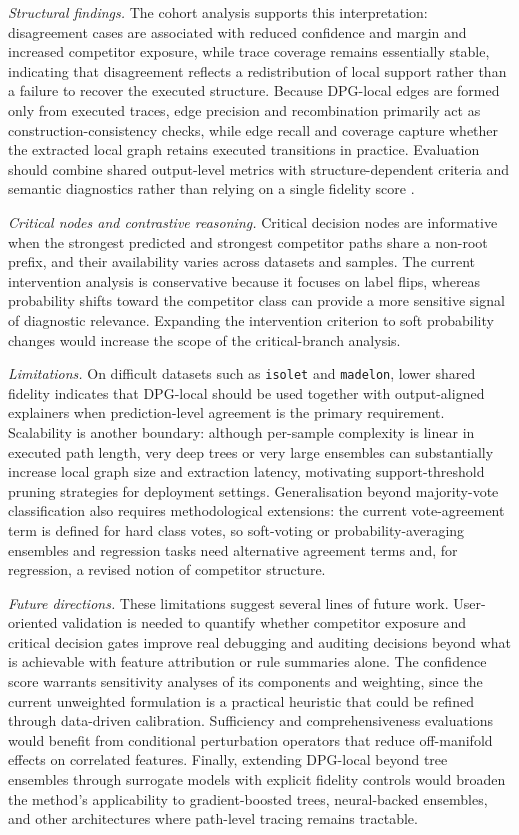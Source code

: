 \documentclass[runningheads]{llncs}
\begin{document}
\emph{Structural findings.} The cohort analysis supports this interpretation: disagreement cases are associated with reduced confidence and margin and increased competitor exposure, while trace coverage remains essentially stable, indicating that disagreement reflects a redistribution of local support rather than a failure to recover the executed structure. Because DPG-local edges are formed only from executed traces, edge precision and recombination primarily act as construction-consistency checks, while edge recall and coverage capture whether the extracted local graph retains executed transitions in practice. Evaluation should combine shared output-level metrics with structure-dependent criteria and semantic diagnostics rather than relying on a single fidelity score \cite{nauta2023anecdotal,doshi2017rigorous}.

\emph{Critical nodes and contrastive reasoning.} Critical decision nodes are informative when the strongest predicted and strongest competitor paths share a non-root prefix, and their availability varies across datasets and samples. The current intervention analysis is conservative because it focuses on label flips, whereas probability shifts toward the competitor class can provide a more sensitive signal of diagnostic relevance. Expanding the intervention criterion to soft probability changes would increase the scope of the critical-branch analysis.

\emph{Limitations.} On difficult datasets such as \texttt{isolet} and \texttt{madelon}, lower shared fidelity indicates that DPG-local should be used together with output-aligned explainers when prediction-level agreement is the primary requirement. Scalability is another boundary: although per-sample complexity is linear in executed path length, very deep trees or very large ensembles can substantially increase local graph size and extraction latency, motivating support-threshold pruning strategies for deployment settings. Generalisation beyond majority-vote classification also requires methodological extensions: the current vote-agreement term is defined for hard class votes, so soft-voting or probability-averaging ensembles and regression tasks need alternative agreement terms and, for regression, a revised notion of competitor structure.

\emph{Future directions.} These limitations suggest several lines of future work. User-oriented validation is needed to quantify whether competitor exposure and critical decision gates improve real debugging and auditing decisions beyond what is achievable with feature attribution or rule summaries alone. The confidence score warrants sensitivity analyses of its components and weighting, since the current unweighted formulation is a practical heuristic that could be refined through data-driven calibration. Sufficiency and comprehensiveness evaluations would benefit from conditional perturbation operators that reduce off-manifold effects on correlated features. Finally, extending DPG-local beyond tree ensembles through surrogate models with explicit fidelity controls would broaden the method's applicability to gradient-boosted trees, neural-backed ensembles, and other architectures where path-level tracing remains tractable.
\end{document}
